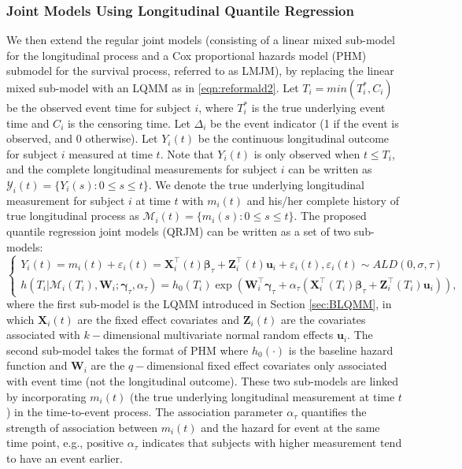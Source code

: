 \subsubsection{Joint Models Using Longitudinal Quantile Regression} %
We then extend the regular joint models (consisting of a linear mixed sub-model for the longitudinal process and a Cox proportional hazards model (PHM) submodel for the survival process, referred to as LMJM), by replacing the linear mixed sub-model with an LQMM as in \eqref{eqn:reformald2}. Let $T_i=min(T_i^*, C_i)$ be the observed event time for subject $i$, where $T_i^*$ is the true underlying event time and $C_i$ is the censoring time. Let $\Delta_i$ be the event indicator (1 if the event is observed, and 0 otherwise). Let $Y_{i}(t)$ be the continuous longitudinal outcome for subject $i$ measured at time $t$. Note that $Y_{i}(t)$ is only observed when $t\le T_i$, and the complete longitudinal measurements for subject $i$ can be written as $\mathcal{Y}_{i}(t)=\{Y_{i}(s): 0\le s\le t\}$. We denote the true underlying longitudinal measurement for subject $i$ at time $t$ with $m_{i}(t)$ and his/her complete history of true longitudinal process as $\mathcal{M}_{i}(t)=\{m_{i}(s): 0\le s \le t\}$. The proposed quantile regression joint models (QRJM) can be written as a set of two sub-models:
\begin{equation}\label{eqn:joint}
\left\{
\begin{array}{l}
Y_{i}(t) = m_{i}(t) + \varepsilon_{i}(t) = {\boldsymbol X}_{i}^{\top}(t)\boldsymbol{\beta}_{\tau} + {\boldsymbol Z}_{i}^{\top}(t){\boldsymbol u}_i + \varepsilon_{i}(t), \varepsilon_{i}(t)\sim ALD(0, \sigma, \tau)\\
h(T_i|\mathcal{M}_{i}(T_i), {\boldsymbol W}_i;  \boldsymbol{\gamma}_{\tau}, \alpha_{\tau}) = h_0(T_i)\exp({\boldsymbol W}_i^{\top}\boldsymbol{\gamma}_{\tau} + \alpha_{\tau}({\boldsymbol X}^{\top}_{i}(T_i)\boldsymbol{\beta}_{\tau} + {\boldsymbol Z}^{\top}_{i}(T_i){\boldsymbol u}_{i})),
\end{array}
\right.
\end{equation}
where the first sub-model is the LQMM introduced in Section \ref{sec:BLQMM}, in which $\boldsymbol{X}_{i}(t)$ are the fixed effect covariates and $\boldsymbol{Z}_{i}(t)$ are the covariates associated with $k-$dimensional multivariate normal random effects $\boldsymbol{u}_i$. The second sub-model takes the format of PHM where $h_0(\cdot)$ is the baseline hazard function and $\boldsymbol{W}_{i}$ are the $q-$dimensional fixed effect covariates only associated with event time (not the longitudinal outcome). These two sub-models are linked by incorporating $m_i(t)$ (the true underlying longitudinal measurement at time $t$) in the time-to-event process. The association parameter $\alpha_{\tau}$ quantifies the strength of association between $m_i(t)$ and the hazard for event at the same time point, e.g., positive $\alpha_{\tau}$ indicates that subjects with higher measurement tend to have an event earlier.

